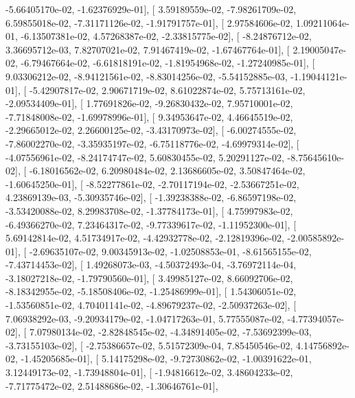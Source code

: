 \documentclass{article}
\begin{document}
         -5.66405170e-02,  -1.62376929e-01],
       [  3.59189559e-02,  -7.98261709e-02,   6.59855018e-02,
         -7.31171126e-02,  -1.91791757e-01],
       [  2.97584606e-02,   1.09211064e-01,  -6.13507381e-02,
          4.57268387e-02,  -2.33815775e-02],
       [ -8.24876712e-02,   3.36695712e-03,   7.82707021e-02,
          7.91467419e-02,  -1.67467764e-01],
       [  2.19005047e-02,  -6.79467664e-02,  -6.61818191e-02,
         -1.81954968e-02,  -1.27240985e-01],
       [  9.03306212e-02,  -8.94121561e-02,  -8.83014256e-02,
         -5.54152885e-03,  -1.19044121e-01],
       [ -5.42907817e-02,   2.90671719e-02,   8.61022874e-02,
          5.75713161e-02,  -2.09534409e-01],
       [  1.77691826e-02,  -9.26830432e-02,   7.95710001e-02,
         -7.71848008e-02,  -1.69978996e-01],
       [  9.34953647e-02,   4.46645519e-02,  -2.29665012e-02,
          2.26600125e-02,  -3.43170973e-02],
       [ -6.00274555e-02,  -7.86002270e-02,  -3.35935197e-02,
         -6.75118776e-02,  -4.69979314e-02],
       [ -4.07556961e-02,  -8.24174747e-02,   5.60830455e-02,
          5.20291127e-02,  -8.75645610e-02],
       [ -6.18016562e-02,   6.20980484e-02,   2.13686605e-02,
          3.50847464e-02,  -1.60645250e-01],
       [ -8.52277861e-02,  -2.70117194e-02,  -2.53667251e-02,
          4.23869139e-03,  -5.30935746e-02],
       [ -1.39238388e-02,  -6.86597198e-02,  -3.53420088e-02,
          8.29983708e-02,  -1.37784173e-01],
       [  4.75997983e-02,  -6.49366270e-02,   7.23464317e-02,
         -9.77339617e-02,  -1.11952300e-01],
       [  5.69142814e-02,   4.51734917e-02,  -4.42932778e-02,
         -2.12819396e-02,  -2.00585892e-01],
       [ -2.69635107e-02,   9.00345913e-02,  -1.02508853e-01,
         -8.61565155e-02,  -7.43714453e-02],
       [  1.49268073e-03,  -4.50372493e-04,  -3.76972114e-04,
         -3.18027218e-02,  -1.79790560e-01],
       [  3.49985127e-02,   8.66092706e-02,  -8.18342955e-02,
         -5.18508406e-02,  -1.25486999e-01],
       [  1.54306051e-02,  -1.53560851e-02,   4.70401141e-02,
         -4.89679237e-02,  -2.50937263e-02],
       [  7.06938292e-03,  -9.20934179e-02,  -1.04717263e-01,
          5.77555087e-02,  -4.77394057e-02],
       [  7.07980134e-02,  -2.82848545e-02,  -4.34891405e-02,
         -7.53692399e-03,  -3.73155103e-02],
       [ -2.75386657e-02,   5.51572309e-04,   7.85450546e-02,
          4.14756892e-02,  -1.45205685e-01],
       [  5.14175298e-02,  -9.72730862e-02,  -1.00391622e-01,
          3.12449173e-02,  -1.73948804e-01],
       [ -1.94816612e-02,   3.48604233e-02,  -7.71775472e-02,
          2.51488686e-02,  -1.30646761e-01],
\end{document}
